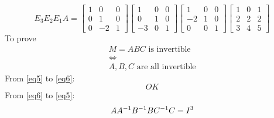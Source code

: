 \documentclass[11pt]{homework}
\begin{document}
    \question
    \begin{equation}
        E_3 E_2 E_1A=
        \left[\begin{array}{ccc}
        1 & 0 & 0 \\ 
        0 & 1 & 0 \\ 
        0 & -2 & 1
        \end{array}\right]
        \left[\begin{array}{ccc}
        1 & 0 & 0 \\ 
        0 & 1 & 0 \\ 
        -3 & 0 & 1
        \end{array}\right]
        \left[\begin{array}{ccc}
        1 & 0 & 0 \\ 
        -2 & 1 & 0 \\ 
        0 & 0 & 1
        \end{array}\right]
        \left[\begin{array}{ccc}
        1 & 0 & 1 \\ 
        2 & 2 & 2 \\ 
        3 & 4 & 5
        \end{array}\right]
    \end{equation}
    \question
    To prove
    \begin{gather}
        M=ABC \text{ is invertible} \label{eq5}\\
        \iff\nonumber\\
        A,B,C \text{ are all invertible}\label{eq6}
    \end{gather}
    From \cref{eq5} to \cref{eq6}:
    \begin{equation}
        OK
    \end{equation}
    From \cref{eq6} to \cref{eq5}:
    \begin{align}
        A\ivt{A}\ivt{B}B\ivt{C}C&=I^3\\
        
    \end{align}
\end{document}
